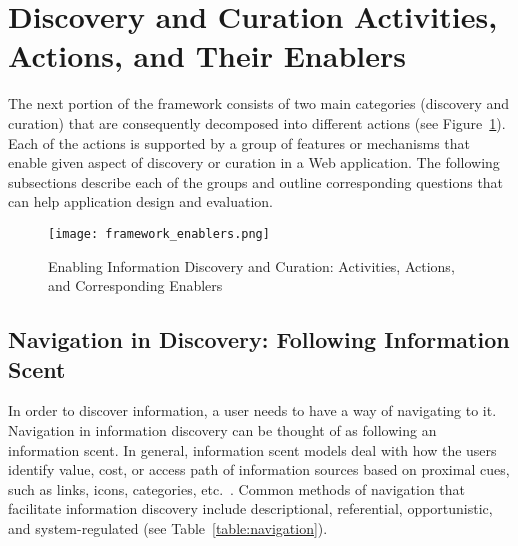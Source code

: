 {\section{Discovery and Curation Activities, Actions, and Their Enablers}
The next portion of the framework consists of two main categories (discovery and curation) that are consequently decomposed into different actions (see Figure~\ref{fig:enablers}). Each of the actions is supported by a group of features or mechanisms that enable given aspect of discovery or curation in a Web application.  The following subsections describe each of the groups and outline corresponding questions that can help application design and evaluation.  

\begin{figure}[ht!]
	\noindent
	\centering
	\texttt{[image: framework\_enablers.png]}
	\caption{Enabling Information Discovery and Curation: Activities, Actions, and Corresponding Enablers}
	\label{fig:enablers} 
\end{figure}

{\subsection{Navigation in Discovery: Following Information Scent}
In order to discover information, a user needs to have a way of navigating to it. Navigation in information discovery can be thought of as following an information scent. In general, information scent models deal with how the users identify value, cost, or access path of information sources based on proximal cues, such as links, icons, categories, etc.~\cite{pirolli1999information}. Common methods of navigation that facilitate information discovery include descriptional, referential, opportunistic, and system-regulated (see Table~\ref{table:navigation}). 


}}
